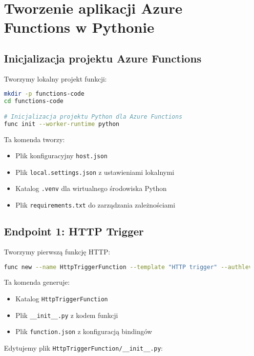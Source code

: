 \documentclass{article}
\begin{document}
\section{Tworzenie aplikacji Azure Functions w Pythonie}

\subsection{Inicjalizacja projektu Azure Functions}

Tworzymy lokalny projekt funkcji:

\begin{lstlisting}[language=bash]
mkdir -p functions-code
cd functions-code

# Inicjalizacja projektu Python dla Azure Functions
func init --worker-runtime python
\end{lstlisting}

Ta komenda tworzy:
\begin{itemize}
    \item Plik konfiguracyjny \texttt{host.json}
    \item Plik \texttt{local.settings.json} z ustawieniami lokalnymi
    \item Katalog \texttt{.venv} dla wirtualnego środowiska Python
    \item Plik \texttt{requirements.txt} do zarządzania zależnościami
\end{itemize}

\subsection{Endpoint 1: HTTP Trigger}

Tworzymy pierwszą funkcję HTTP:

\begin{lstlisting}[language=bash]
func new --name HttpTriggerFunction --template "HTTP trigger" --authlevel "function"
\end{lstlisting}

Ta komenda generuje:
\begin{itemize}
    \item Katalog \texttt{HttpTriggerFunction}
    \item Plik \texttt{\_\_init\_\_.py} z kodem funkcji
    \item Plik \texttt{function.json} z konfiguracją bindingów
\end{itemize}

Edytujemy plik \texttt{HttpTriggerFunction/\_\_init\_\_.py}:
\end{document}
